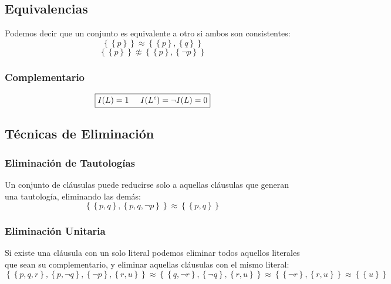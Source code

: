 \subsection{Equivalencias}
\noindent Podemos decir que un conjunto es equivalente a otro si ambos son consistentes:
\[
        \boxed{\left \{ \left. \left \{ \left. p \right \} \right. \right \} \right. \approx \left \{ \left. \left \{ p\left.  \right \} \right. ,\left \{ \left. q \right \} \right.\right \} \right.}
\]
\[
        \boxed{\left \{ \left. \left \{ \left. p \right \} \right. \right \} \right. \not \approx \left \{ \left. \left \{ p\left.  \right \} \right. ,\left \{ \left. \neg p \right \} \right.\right \} \right.}
\]
\subsubsection{Complementario}
\[
        \boxed{I(L) = 1 \hspace{5mm} I(L^c) = \neg I(L) = 0}
\]
\subsection{Técnicas de Eliminación}
\subsubsection{Eliminación de Tautologías}
\noindent Un conjunto de cláusulas puede reducirse solo a aquellas cláusulas que generan una tautología, eliminando las demás:
\[
        \boxed{\left \{ \left. \left \{ \left. p,q \right \} \right.,\left \{ \left. p,q, \neg p \right \} \right. \right \} \right. \approx \left \{ \left. \left \{ \left. p,q \right \} \right. \right \} \right.}
\]
\subsubsection{Eliminación Unitaria}
\noindent Si existe una cláusula con un solo literal podemos eliminar todos aquellos literales que sean su complementario, y eliminar aquellas cláusulas con el mismo literal:
\[
        \boxed{\left \{ \left. \left \{ \left. p,q,r \right \} \right.,\left \{ \left. p,\neg q \right \} \right.,\left \{ \left. \neg p \right \} \right. ,\left \{ \left. r,u \right \} \right. \right \} \right.\approx \left \{ \left. \left \{ \left. q, \neg r \right \} \right., \left \{ \left. \neg q \right \} \right.,\left \{ \left. r,u \right \} \right. \right \} \right. \approx \left \{ \left. \left \{ \left. \neg r \right \} \right.,\left \{ \left. r,u \right \} \right. \right \} \right. \approx \left \{ \left. \left \{ \left. u \right \} \right. \right \} \right.}
\]
